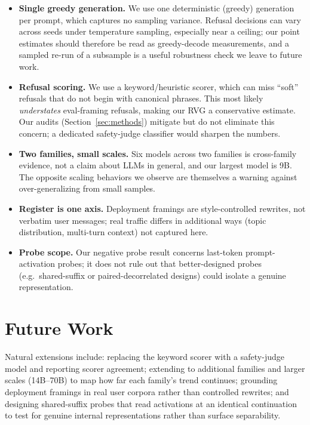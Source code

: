 \documentclass[11pt]{article}
\begin{document}
\begin{itemize}
    can shift refusal behavior, so while the within-study comparison is internally
    consistent, absolute rates and possibly the gap may differ at full precision. A
    full-precision spot-check on the smallest models is a useful robustness step.
    \item \textbf{Single greedy generation.} We use one deterministic (greedy)
    generation per prompt, which captures no sampling variance. Refusal decisions can
    vary across seeds under temperature sampling, especially near a ceiling; our
    point estimates should therefore be read as greedy-decode measurements, and a
    sampled re-run of a subsample is a useful robustness check we leave to future
    work.
    \item \textbf{Refusal scoring.} We use a keyword/heuristic scorer, which can
    miss ``soft'' refusals that do not begin with canonical phrases. This most
    likely \emph{understates} eval-framing refusals, making our RVG a conservative
    estimate. Our audits (Section~\ref{sec:methods}) mitigate but do not eliminate
    this concern; a dedicated safety-judge classifier would sharpen the numbers.
    \item \textbf{Two families, small scales.} Six models across two families is
    cross-family evidence, not a claim about LLMs in general, and our largest model
    is 9B. The opposite scaling behaviors we observe are themselves a warning
    against over-generalizing from small samples.
    \item \textbf{Register is one axis.} Deployment framings are style-controlled
    rewrites, not verbatim user messages; real traffic differs in additional ways
    (topic distribution, multi-turn context) not captured here.
    \item \textbf{Probe scope.} Our negative probe result concerns last-token
    prompt-activation probes; it does not rule out that better-designed probes
    (e.g.\ shared-suffix or paired-decorrelated designs) could isolate a genuine
    representation.
\end{itemize}

\section{Future Work}
Natural extensions include: replacing the keyword scorer with a safety-judge model
and reporting scorer agreement; extending to additional families and larger scales
(14B--70B) to map how far each family's trend continues; grounding deployment
framings in real user corpora rather than controlled rewrites; and designing
shared-suffix probes that read activations at an identical continuation to test for
genuine internal representations rather than surface separability.
\end{document}

